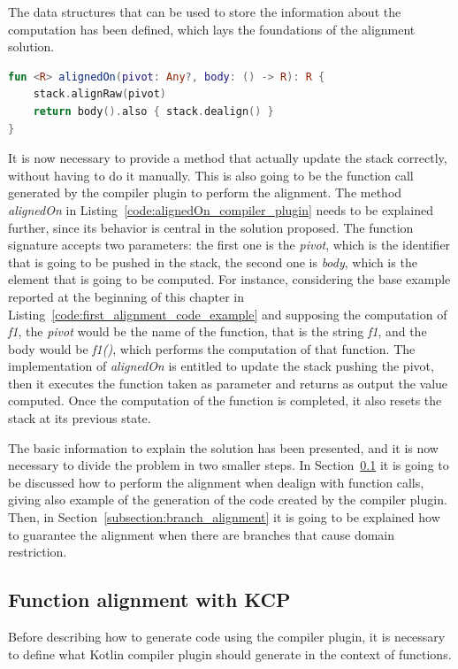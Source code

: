 The data structures that can be used to store the information about the computation has been defined, which lays the foundations of the alignment solution.
\begin{lstlisting}[caption={Function that perfoms the alignment in the Kotlin compiler plugin solution}, captionpos=b, language=Kotlin, label={code:alignedOn_compiler_plugin}]
fun <R> alignedOn(pivot: Any?, body: () -> R): R {
    stack.alignRaw(pivot)
    return body().also { stack.dealign() }
}
\end{lstlisting}
It is now necessary to provide a method that actually update the stack correctly, without having to do it manually. This is also going to be the function call generated by the compiler plugin to perform the alignment.\newline
The method \textit{alignedOn} in Listing~\ref{code:alignedOn_compiler_plugin} needs to be explained further, since its behavior is central in the solution proposed.\newline
The function signature accepts two parameters: the first one is the \textit{pivot}, which is the identifier that is going to be pushed in the stack, the second one is \textit{body}, which is the element that is going to be computed.\newline
For instance, considering the base example reported at the beginning of this chapter in Listing~\ref{code:first_alignment_code_example} and supposing the computation of \textit{f1}, the \textit{pivot} would be the name of the function, that is the string \textit{f1}, and the body would be \textit{f1()}, which performs the computation of that function.\newline
The implementation of \textit{alignedOn} is entitled to update the stack pushing the pivot, then it executes the function taken as parameter and returns as output the value computed. Once the computation of the function is completed, it also resets the stack at its previous state.

The basic information to explain the solution has been presented, and it is now necessary to divide the problem in two smaller steps. In Section~\ref{subsection:function_alignment} it is going to be discussed how to perform the alignment when dealign with function calls, giving also example of the generation of the code created by the compiler plugin. Then, in Section~\ref{subsection:branch_alignment} it is going to be explained how to guarantee the alignment when there are branches that cause domain restriction.

\subsection{Function alignment with KCP}\label{subsection:function_alignment}
Before describing how to generate code using the compiler plugin, it is necessary to define what Kotlin compiler plugin should generate in the context of functions.

